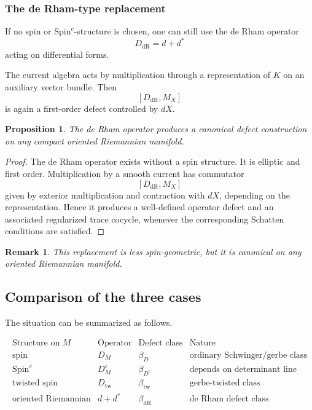 \documentclass[11pt]{amsart}
\newtheorem{proposition}[definition]{Proposition}
\newtheorem{remark}[definition]{Remark}
\begin{document}
\subsubsection{The de Rham-type replacement}

If no spin or \(\mathrm{Spin}^c\)-structure is chosen, one can still use the de Rham operator
\[
D_{\mathrm{dR}}=d+d^*
\]
acting on differential forms.

The current algebra acts by multiplication through a representation of \(K\) on an auxiliary vector bundle. Then
\[
[D_{\mathrm{dR}},M_X]
\]
is again a first-order defect controlled by \(dX\).

\begin{proposition}
The de Rham operator produces a canonical defect construction on any compact oriented Riemannian manifold.
\end{proposition}

\begin{proof}
The de Rham operator exists without a spin structure. It is elliptic and first order. Multiplication by a smooth current has commutator
\[
[D_{\mathrm{dR}},M_X]
\]
given by exterior multiplication and contraction with \(dX\), depending on the representation. Hence it produces a well-defined operator defect and an associated regularized trace cocycle, whenever the corresponding Schatten conditions are satisfied.
\end{proof}

\begin{remark}
This replacement is less spin-geometric, but it is canonical on any oriented Riemannian manifold.
\end{remark}

\subsection{Comparison of the three cases}

The situation can be summarized as follows.

\[
\begin{array}{c|c|c|c}
\text{Structure on }M & \text{Operator} & \text{Defect class} & \text{Nature} \\
\hline
\text{spin} & D_M & \beta_D & \text{ordinary Schwinger/gerbe class} \\
\mathrm{Spin}^c & D_M^c & \beta_{D^c} & \text{depends on determinant line} \\
\text{twisted spin} & D_{\mathrm{tw}} & \beta_{\mathrm{tw}} & \text{gerbe-twisted class} \\
\text{oriented Riemannian} & d+d^* & \beta_{\mathrm{dR}} & \text{de Rham defect class}
\end{array}
\]
\end{document}
